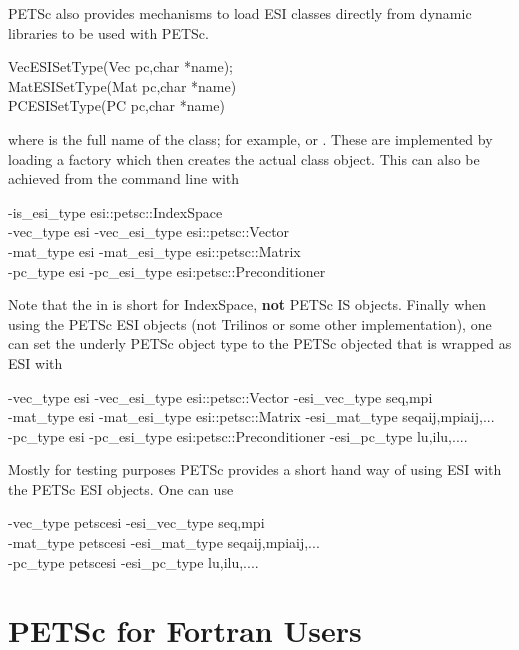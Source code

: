 PETSc also provides mechanisms to load ESI classes directly from dynamic libraries to be
used with PETSc.
\begin{tabbing}
VecESISetType(Vec pc,char *name);\\
MatESISetType(Mat pc,char *name)\\
PCESISetType(PC pc,char *name)
\end{tabbing}
where  is the full name of the class; for example, 
or . These are implemented by loading a factory which then creates the
actual class object. This can also be achieved from the command line with 
\begin{tabbing}
-is\_esi\_type  esi::petsc::IndexSpace\\
-vec\_type esi -vec\_esi\_type esi::petsc::Vector\\
-mat\_type esi -mat\_esi\_type esi::petsc::Matrix\\
-pc\_type esi -pc\_esi\_type esi:petsc::Preconditioner
\end{tabbing}
Note that the  in  is short for IndexSpace, {\bf not} PETSc IS objects.
Finally when using the PETSc ESI objects (not Trilinos or some other implementation), one
can set the underly PETSc object type to the PETSc objected that is wrapped as ESI with
\begin{tabbing}
-vec\_type esi -vec\_esi\_type esi::petsc::Vector  -esi\_vec\_type \trl{<}seq,mpi\trl{>}\\
-mat\_type esi -mat\_esi\_type esi::petsc::Matrix -esi\_mat\_type \trl{<}seqaij,mpiaij,...\trl{>}\\
-pc\_type esi -pc\_esi\_type esi:petsc::Preconditioner -esi\_pc\_type \trl{<}lu,ilu,....\trl{>}
\end{tabbing}
Mostly for testing purposes PETSc provides a short hand way of using ESI with the PETSc ESI objects.
One can use 
\begin{tabbing}
-vec\_type petscesi  -esi\_vec\_type \trl{<}seq,mpi\trl{>}\\
-mat\_type petscesi -esi\_mat\_type \trl{<}seqaij,mpiaij,...\trl{>}\\
-pc\_type petscesi -esi\_pc\_type \trl{<}lu,ilu,....\trl{>}
\end{tabbing}



\cleardoublepage
\chapter{PETSc for Fortran Users}
\label{ch_fortran}

